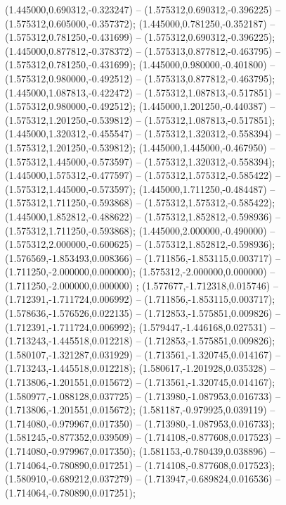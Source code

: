  (1.445000,0.690312,-0.323247) -- (1.575312,0.690312,-0.396225) -- (1.575312,0.605000,-0.357372);
 (1.445000,0.781250,-0.352187) -- (1.575312,0.781250,-0.431699) -- (1.575312,0.690312,-0.396225);
 (1.445000,0.877812,-0.378372) -- (1.575313,0.877812,-0.463795) -- (1.575312,0.781250,-0.431699);
 (1.445000,0.980000,-0.401800) -- (1.575312,0.980000,-0.492512) -- (1.575313,0.877812,-0.463795);
 (1.445000,1.087813,-0.422472) -- (1.575312,1.087813,-0.517851) -- (1.575312,0.980000,-0.492512);
 (1.445000,1.201250,-0.440387) -- (1.575312,1.201250,-0.539812) -- (1.575312,1.087813,-0.517851);
 (1.445000,1.320312,-0.455547) -- (1.575312,1.320312,-0.558394) -- (1.575312,1.201250,-0.539812);
 (1.445000,1.445000,-0.467950) -- (1.575312,1.445000,-0.573597) -- (1.575312,1.320312,-0.558394);
 (1.445000,1.575312,-0.477597) -- (1.575312,1.575312,-0.585422) -- (1.575312,1.445000,-0.573597);
 (1.445000,1.711250,-0.484487) -- (1.575312,1.711250,-0.593868) -- (1.575312,1.575312,-0.585422);
 (1.445000,1.852812,-0.488622) -- (1.575312,1.852812,-0.598936) -- (1.575312,1.711250,-0.593868);
 (1.445000,2.000000,-0.490000) -- (1.575312,2.000000,-0.600625) -- (1.575312,1.852812,-0.598936);
 (1.576569,-1.853493,0.008366) -- (1.711856,-1.853115,0.003717) -- (1.711250,-2.000000,0.000000);
 (1.575312,-2.000000,0.000000) -- (1.711250,-2.000000,0.000000) ;
 (1.577677,-1.712318,0.015746) -- (1.712391,-1.711724,0.006992) -- (1.711856,-1.853115,0.003717);
 (1.578636,-1.576526,0.022135) -- (1.712853,-1.575851,0.009826) -- (1.712391,-1.711724,0.006992);
 (1.579447,-1.446168,0.027531) -- (1.713243,-1.445518,0.012218) -- (1.712853,-1.575851,0.009826);
 (1.580107,-1.321287,0.031929) -- (1.713561,-1.320745,0.014167) -- (1.713243,-1.445518,0.012218);
 (1.580617,-1.201928,0.035328) -- (1.713806,-1.201551,0.015672) -- (1.713561,-1.320745,0.014167);
 (1.580977,-1.088128,0.037725) -- (1.713980,-1.087953,0.016733) -- (1.713806,-1.201551,0.015672);
 (1.581187,-0.979925,0.039119) -- (1.714080,-0.979967,0.017350) -- (1.713980,-1.087953,0.016733);
 (1.581245,-0.877352,0.039509) -- (1.714108,-0.877608,0.017523) -- (1.714080,-0.979967,0.017350);
 (1.581153,-0.780439,0.038896) -- (1.714064,-0.780890,0.017251) -- (1.714108,-0.877608,0.017523);
 (1.580910,-0.689212,0.037279) -- (1.713947,-0.689824,0.016536) -- (1.714064,-0.780890,0.017251);
